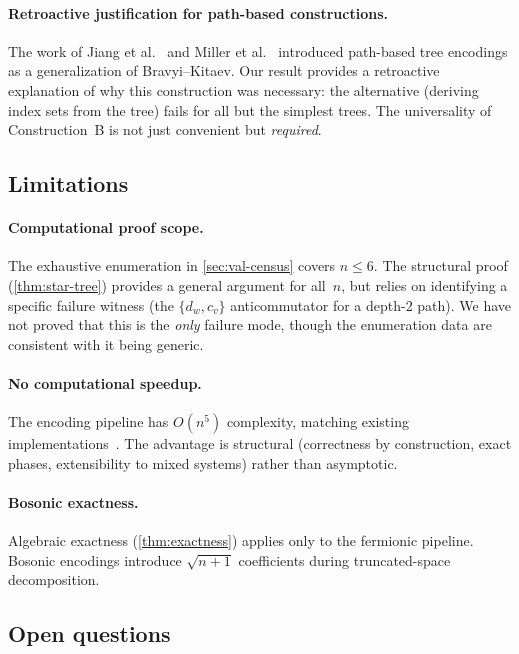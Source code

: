 \paragraph{Retroactive justification for path-based constructions.}
The work of Jiang et al.~\cite{jiang2020} and Miller et
al.~\cite{miller2023bonsai} introduced path-based tree encodings as
a generalization of Bravyi--Kitaev.  Our result provides a
retroactive explanation of why this construction was necessary: the
alternative (deriving index sets from the tree) fails for all but
the simplest trees.  The universality of Construction~B is not just
convenient but \emph{required}.

\subsection{Limitations}

\paragraph{Computational proof scope.}
The exhaustive enumeration in \cref{sec:val-census} covers
$n \le 6$.  The structural proof (\cref{thm:star-tree}) provides a
general argument for all~$n$, but relies on identifying a specific
failure witness (the $\{d_w, c_v\}$ anticommutator for a depth-2
path).  We have not proved that this is the \emph{only} failure mode,
though the enumeration data are consistent with it being generic.

\paragraph{No computational speedup.}
The encoding pipeline has $O(n^5)$ complexity, matching existing
implementations~\cite{mcclean2020, bergholm2022}.  The advantage is
structural (correctness by construction, exact phases, extensibility
to mixed systems) rather than asymptotic.

\paragraph{Bosonic exactness.}
Algebraic exactness (\cref{thm:exactness}) applies only to the
fermionic pipeline.  Bosonic encodings introduce $\sqrt{n+1}$
coefficients during truncated-space decomposition.

\subsection{Open questions}

